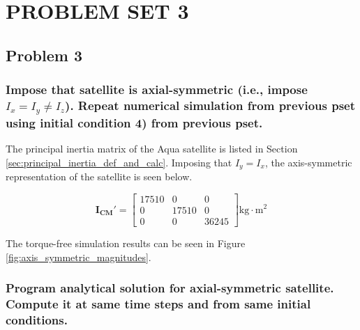 \section{\Large PROBLEM SET 3}
\subsection{Problem 3}

\subsubsection{Impose that satellite is axial-symmetric (i.e., impose $I_x=I_y\neq I_z$). Repeat numerical simulation from previous pset using initial condition 4) from previous pset.}

The principal inertia matrix of the Aqua satellite is listed in Section \ref{sec:principal_inertia_def_and_calc}. Imposing that $I_y=I_x$, the axis-symmetric representation of the satellite is seen below.

\begin{equation*}
    \boldsymbol{I_{CM}'} = \begin{bmatrix}
        17510 & 0 & 0 \\
        0 & 17510 & 0 \\
        0 & 0 & 36245
    \end{bmatrix} \text{kg} \cdot \text{m}^2
\end{equation*}

The torque-free simulation results can be seen in Figure \ref{fig:axis_symmetric_magnitudes}.

\subsubsection{Program analytical solution for axial-symmetric satellite. Compute it at same time steps and from same initial conditions.}

